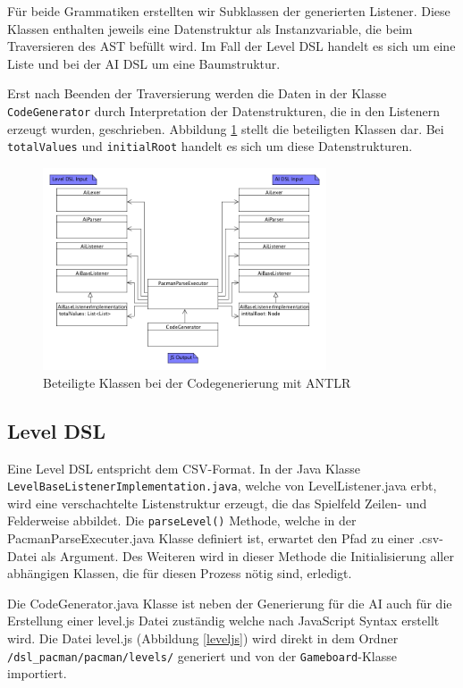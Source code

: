 \documentclass[conference]{IEEEtran}
\begin{document}
Für beide Grammatiken erstellten wir Subklassen der generierten Listener. Diese Klassen enthalten jeweils eine Datenstruktur als Instanzvariable, die beim Traversieren des AST befüllt wird. Im Fall der Level DSL handelt es sich um eine Liste und bei der AI DSL um eine Baumstruktur.

Erst nach Beenden der Traversierung werden die Daten in der Klasse \texttt{CodeGenerator} durch Interpretation der Datenstrukturen, die in den Listenern erzeugt wurden, geschrieben. Abbildung \ref{antlr_classes} stellt die beteiligten Klassen dar. Bei \texttt{totalValues} und \texttt{initialRoot} handelt es sich um diese Datenstrukturen.

\begin{figure}[!htb]
\centering
\includegraphics[width=3.3in]{code_gen_rough.png}

\caption{Beteiligte Klassen bei der Codegenerierung mit ANTLR}
\label{antlr_classes}
\end{figure}

\subsection{Level DSL}
Eine Level DSL entspricht dem CSV-Format. In der Java Klasse \texttt{LevelBaseListenerImplementation.java}, welche von LevelListener.java erbt, wird eine verschachtelte Listenstruktur erzeugt, die das Spielfeld Zeilen- und Felderweise abbildet. Die \texttt{parseLevel()} Methode, welche in der PacmanParseExecuter.java Klasse definiert ist, erwartet den Pfad zu einer .csv-Datei als Argument. Des Weiteren wird in dieser Methode die Initialisierung aller abhängigen Klassen, die für diesen Prozess nötig sind, erledigt.

Die CodeGenerator.java Klasse ist neben der Generierung für die AI auch für die Erstellung einer level.js Datei zuständig welche nach JavaScript Syntax erstellt wird. Die Datei level.js (Abbildung \ref{leveljs})
wird direkt in dem Ordner \texttt{/dsl\_pacman/pacman/levels/} generiert und von der \texttt{Gameboard}-Klasse importiert.
\end{document}
